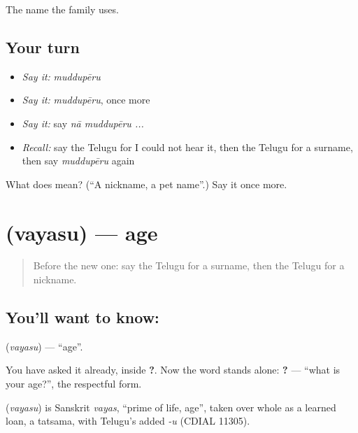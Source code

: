 \begin{grammarlens}[title={What you've built}]
The name the family uses.
\end{grammarlens}

\subsection*{Your turn}
\begin{itemize}
\raggedright
  \item \emph{Say it:} \emph{muddupēru}
  \item \emph{Say it:} \emph{muddupēru}, once more
  \item \emph{Say it:} say \emph{nā muddupēru ...}
  \item \emph{Recall:} say the Telugu for I could not hear it, then the Telugu for a surname, then say \emph{muddupēru} again
\end{itemize}

\begin{tcolorbox}[breakable,colback=teal!4,colframe=teal!35!black,title={Before you move on}]
What does  mean? (\textquotedblleft{}A nickname, a pet name\textquotedblright{}.) Say it once more.
\end{tcolorbox}
\section[\texorpdfstring{\te{వయసు} (vayasu)}{వయసు (vayasu)}]{ (vayasu) — age}

\label{lesson:TE-C96-age}



\begin{quote}
Before the new one: say the Telugu for a surname, then the Telugu for a nickname.
\end{quote}

\subsection*{You'll want to know: }
\textbf{} (\emph{vayasu}) — \textquotedblleft{}age\textquotedblright{}.

You have asked it already, inside \textbf{ ?}. Now the word stands alone: \textbf{  ?} — \textquotedblleft{}what is your age?\textquotedblright{}, the respectful form.

\begin{cousinweb}
\textbf{} (\emph{vayasu}) is Sanskrit \emph{vayas}, \textquotedblleft{}prime of life, age\textquotedblright{}, taken over whole as a learned loan, a tatsama, with Telugu's added \emph{-u} (CDIAL 11305).
\end{cousinweb}

